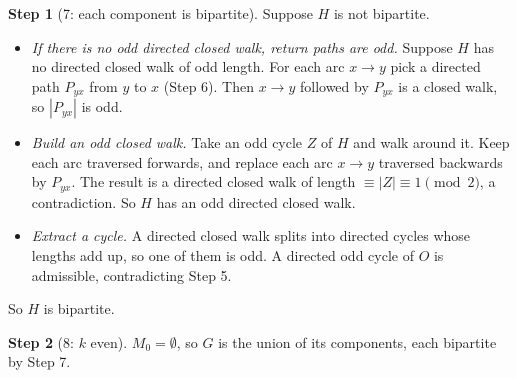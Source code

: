 \documentclass[11pt]{article}
\theoremstyle{plain}
\theoremstyle{definition}
\newtheorem*{step}{Step}
\begin{document}
\begin{step}[7: each component is bipartite]
Suppose $H$ is not bipartite.
\begin{itemize}[nosep]
  \item \emph{If there is no odd directed closed walk, return paths are odd.} Suppose $H$ has no
        directed closed walk of odd length. For each arc $x \to y$ pick a directed path $P_{yx}$
        from $y$ to $x$ (Step 6). Then $x \to y$ followed by $P_{yx}$ is a closed walk, so
        $|P_{yx}|$ is odd.
  \item \emph{Build an odd closed walk.} Take an odd cycle $Z$ of $H$ and walk around it. Keep
        each arc traversed forwards, and replace each arc $x \to y$ traversed backwards by
        $P_{yx}$. The result is a directed closed walk of length $\equiv |Z| \equiv 1
        \pmod 2$, a contradiction. So $H$ has an odd directed closed walk.
  \item \emph{Extract a cycle.} A directed closed walk splits into directed cycles whose lengths
        add up, so one of them is odd. A directed odd cycle of $O$ is admissible, contradicting
        Step 5.
\end{itemize}
So $H$ is bipartite.
\end{step}

\begin{step}[8: $k$ even]
$M_0 = \emptyset$, so $G$ is the union of its components, each bipartite by Step 7.
\end{step}
\end{document}

